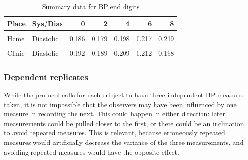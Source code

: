 \documentclass[
]{article}
\begin{document}
\begin{table}[!h]

\caption{\label{tab:digit-summary}Summary data for BP end digits}
\centering
\begin{tabular}[t]{llrrrrr}
\toprule
Place & Sys/Dias & 0 & 2 & 4 & 6 & 8\\
\midrule
\cellcolor{gray!6}{Home} & \cellcolor{gray!6}{Systolic} & \cellcolor{gray!6}{0.240} & \cellcolor{gray!6}{0.199} & \cellcolor{gray!6}{0.159} & \cellcolor{gray!6}{0.169} & \cellcolor{gray!6}{0.233}\\
Home & Diastolic & 0.186 & 0.179 & 0.198 & 0.217 & 0.219\\
\cellcolor{gray!6}{Clinic} & \cellcolor{gray!6}{Systolic} & \cellcolor{gray!6}{0.267} & \cellcolor{gray!6}{0.188} & \cellcolor{gray!6}{0.160} & \cellcolor{gray!6}{0.159} & \cellcolor{gray!6}{0.226}\\
Clinic & Diastolic & 0.192 & 0.189 & 0.209 & 0.212 & 0.198\\
\bottomrule
\end{tabular}
\end{table}

\hypertarget{sec:pseudorep}{%
\subsubsection{Dependent replicates}\label{sec:pseudorep}}

While the protocol calls for each subject to have three independent BP measures taken, it is not impossible that the observers may have been influenced by one measure in recording the next.
This could happen in either direction: later measurements could be pulled closer to the first, or there could be an inclination to avoid repeated measures.
This is relevant, because erroneously repeated measures would artificially decrease the variance of the three measurements, and avoiding repeated measures would have the opposite effect.
\end{document}
